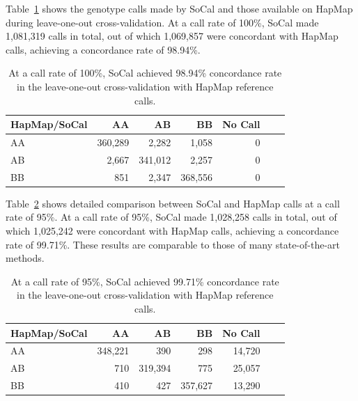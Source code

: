 \documentclass{scrartcl}
\begin{document}
\par
Table~\ref{table:cmp_hapmap_socal_100} shows the genotype calls made by SoCal
and those available on HapMap during leave-one-out cross-validation.
At a call rate of 100\%, SoCal made 1,081,319 calls in total, out of which
1,069,857 were concordant with HapMap calls, achieving a concordance
rate of 98.94\%.

\begin{table}[H]
\centering
\begin{tabular}{l*{5}{r}r}
    \hline
    HapMap/SoCal  & AA       & AB      & BB      & No Call \\ \hline
    AA            & 360,289  & 2,282   & 1,058   & 0  \\
    AB            & 2,667    & 341,012 & 2,257   & 0  \\
    BB            & 851      & 2,347   & 368,556 & 0  \\ \hline
\end{tabular}
\caption{At a call rate of 100\%, SoCal achieved 98.94\% concordance rate
in the leave-one-out cross-validation with HapMap reference calls.}
\label{table:cmp_hapmap_socal_100}
\end{table}

\par
Table~\ref{table:cmp_hapmap_socal_95} shows detailed comparison between
SoCal and HapMap calls at a call rate of 95\%.
At a call rate of 95\%, SoCal made 1,028,258 calls in total, out of which
1,025,242 were concordant with HapMap calls, achieving a concordance
rate of 99.71\%.
These results are comparable to those of many state-of-the-art methods.

\begin{table}[H]
\centering
\begin{tabular}{l*{5}{r}r}
    \hline
    HapMap/SoCal  & AA       & AB      & BB      & No Call \\ \hline
    AA            & 348,221  & 390     & 298     & 14,720  \\
    AB            & 710      & 319,394 & 775     & 25,057  \\
    BB            & 410      & 427     & 357,627 & 13,290  \\ \hline
\end{tabular}
\caption{At a call rate of 95\%, SoCal achieved 99.71\% concordance rate
in the leave-one-out cross-validation with HapMap reference calls.}
\label{table:cmp_hapmap_socal_95}
\end{table}
\end{document}
